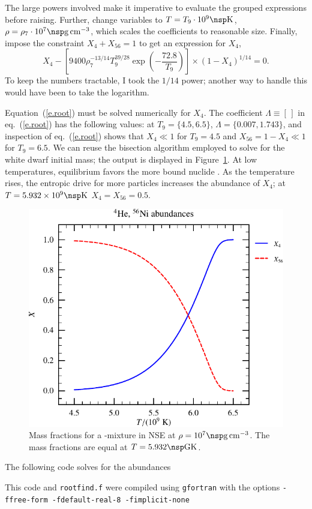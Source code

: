 \documentclass[11pt]{article}
\begin{document}
The large powers involved make it imperative to evaluate the grouped expressions before raising. Further, change variables to $T = T_{9}\cdot 10^{9}\nsp\K$, $\rho = \rho_{7}\cdot 10^{7}\nsp\grampercc$, which scales the coefficients to reasonable size. Finally, impose the constraint $X_{4} + X_{56} = 1$ to get an expression for $X_{4}$,
\begin{equation}\label{e.root}
X_{4} - \left[9400  \rho_{7}^{-13/14} T_{9}^{39/28}\exp\left(-\frac{72.8}{T_{9}}\right)\right] \times (1-X_{4})^{1/14} = 0.
\end{equation}
To keep the numbers tractable, I took the $1/14$ power; another way to handle this would have been to take the logarithm.

Equation~(\ref{e.root}) must be solved numerically for $X_{4}$.   The coefficient $\Lambda \equiv [\,]$ in eq.~(\ref{e.root}) has the following values: at $T_{9} = \{4.5, 6.5\}$, $\Lambda = \{0.007,1.743\}$, and inspection of eq.~(\ref{e.root}) shows that $X_{4} \ll 1$ for $T_{9}=4.5$ and $X_{56} =1-X_{4}\ll 1$ for $T_{9} = 6.5$.
We can reuse the bisection algorithm employed to solve for the white dwarf initial mass; the output is displayed in Figure~\ref{f.nse}. At low temperatures, equilibrium favors the more bound nuclide \nickel[56]. As the temperature rises, the entropic drive for more particles increases the abundance of $X_{4}$; at $T = 5.932\ee{9}\nsp\K$ $X_{4}=X_{56}=0.5$.

\begin{figure}[htbp]
\includegraphics[width=5in]{plots_out/mass_fraction}
\caption{Mass fractions for a \helium-\nickel[56] mixture in NSE at $\rho = 10^{7}\nsp\grampercc$.  The mass fractions are equal at $T = 5.932\nsp\Giga\K$.\label{f.nse}}
\end{figure}
\clearpage

The following code solves for the abundances

This code and \verb|rootfind.f| were compiled using \verb|gfortran| with the options
\verb|-ffree-form -fdefault-real-8 -fimplicit-none|
\end{document}
